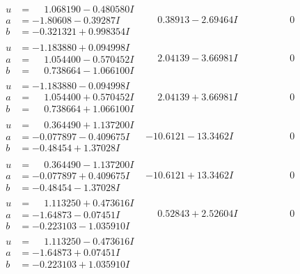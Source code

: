 \documentclass[1p]{elsarticle_modified}
\theoremstyle{definition}
\begin{document}
$$\begin{array}{c|c|c}
\begin{aligned}
u &= \phantom{-}1.068190 - 0.480580 I \\
a &= -1.80608 - 0.39287 I \\
b &= -0.321321 + 0.998354 I\end{aligned}
 & \phantom{-}0.38913 - 2.69464 I & \phantom{-0.000000 } 0 \\ \hline\begin{aligned}
u &= -1.183880 + 0.094998 I \\
a &= \phantom{-}1.054400 - 0.570452 I \\
b &= \phantom{-}0.738664 - 1.066100 I\end{aligned}
 & \phantom{-}2.04139 - 3.66981 I & \phantom{-0.000000 } 0 \\ \hline\begin{aligned}
u &= -1.183880 - 0.094998 I \\
a &= \phantom{-}1.054400 + 0.570452 I \\
b &= \phantom{-}0.738664 + 1.066100 I\end{aligned}
 & \phantom{-}2.04139 + 3.66981 I & \phantom{-0.000000 } 0 \\ \hline\begin{aligned}
u &= \phantom{-}0.364490 + 1.137200 I \\
a &= -0.077897 - 0.409675 I \\
b &= -0.48454 + 1.37028 I\end{aligned}
 & -10.6121 - 13.3462 I & \phantom{-0.000000 } 0 \\ \hline\begin{aligned}
u &= \phantom{-}0.364490 - 1.137200 I \\
a &= -0.077897 + 0.409675 I \\
b &= -0.48454 - 1.37028 I\end{aligned}
 & -10.6121 + 13.3462 I & \phantom{-0.000000 } 0 \\ \hline\begin{aligned}
u &= \phantom{-}1.113250 + 0.473616 I \\
a &= -1.64873 - 0.07451 I \\
b &= -0.223103 - 1.035910 I\end{aligned}
 & \phantom{-}0.52843 + 2.52604 I & \phantom{-0.000000 } 0 \\ \hline\begin{aligned}
u &= \phantom{-}1.113250 - 0.473616 I \\
a &= -1.64873 + 0.07451 I \\
b &= -0.223103 + 1.035910 I\end{aligned}

\end{array}$$
\end{document}
